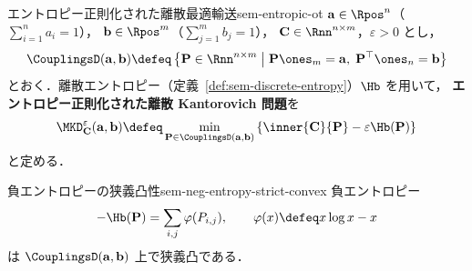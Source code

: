 \begin{definition}{エントロピー正則化された離散最適輸送}{sem-entropic-ot}
  $\mathbf{a} \in \Rpos^n$（$\sum_{i=1}^n a_i = 1$），
  $\mathbf{b} \in \Rpos^m$（$\sum_{j=1}^m b_j = 1$），
  $\mathbf{C} \in \Rnn^{n \times m}$，$\varepsilon > 0$ とし，
  \[
    \CouplingsD(\mathbf{a}, \mathbf{b})
    \defeq
    \left\{
      \mathbf{P} \in \Rnn^{n \times m}
      \;\middle|\;
      \mathbf{P}\ones_m = \mathbf{a},\;
      \mathbf{P}^\top\ones_n = \mathbf{b}
    \right\}
  \]
  とおく．離散エントロピー（定義~\ref{def:sem-discrete-entropy}）$\Hb$ を用いて，
  \textbf{エントロピー正則化された離散 Kantorovich 問題}を
  \[
    \MKD_{\mathbf{C}}^\varepsilon(\mathbf{a}, \mathbf{b})
    \defeq
    \min_{\mathbf{P} \in \CouplingsD(\mathbf{a}, \mathbf{b})}
    \left\{
      \inner{\mathbf{C}}{\mathbf{P}}
      - \varepsilon \Hb(\mathbf{P})
    \right\}
  \]
  と定める．
\end{definition}

\begin{claim}{負エントロピーの狭義凸性}{sem-neg-entropy-strict-convex}
  負エントロピー
  \[
    -\Hb(\mathbf{P}) = \sum_{i,j}\varphi(P_{i,j}),
    \qquad \varphi(x) \defeq x\log x - x
  \]
  は $\CouplingsD(\mathbf{a}, \mathbf{b})$ 上で狭義凸である．
\end{claim}

